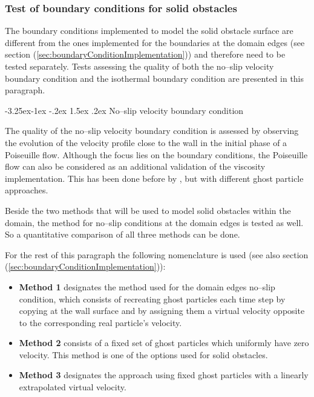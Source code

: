 \documentclass[11pt,a4paper,twoside]{report}
\makeatletter
\renewcommand\paragraph{\@startsection{paragraph}{4}{\z@}%
  {-3.25ex\@plus -1ex \@minus -.2ex}%
  {1.5ex \@plus .2ex}%
  {\normalfont\normalsize\bfseries}}
\makeatother
\begin{document}
\subsubsection{Test of boundary conditions for solid obstacles}
\label{sec:TestSolobs_BC}
The boundary conditions implemented to model the solid obstacle surface are different from the ones implemented for the boundaries at the domain edges (see section (\ref{sec:boundaryConditionImplementation})) and therefore need to be tested separately.
Tests assessing the quality of both the no--slip velocity boundary condition and the isothermal boundary condition are presented in this paragraph. 

\paragraph{No--slip velocity boundary condition}
\label{sec:TestSolobs_BC_noSlip}

The quality of the no--slip velocity boundary condition is assessed by observing the evolution of the velocity profile close to the wall in the initial phase of a Poiseuille flow. Although the focus lies on the boundary conditions, the Poiseuille flow can also be considered as an additional validation of the viscosity implementation. This has been done before by \cite{Basa2009}, but with different ghost particle approaches.

Beside the two methods that will be used to model solid obstacles within the domain, the method for no--slip conditions at the domain edges is tested as well. So a quantitative comparison of all three methods can be done.

For the rest of this paragraph the following nomenclature is used (see also section (\ref{sec:boundaryConditionImplementation})):
\begin{itemize}
 \item {\bf Method 1} designates the method used for the domain edges no--slip condition, which consists of recreating ghost particles each time step by copying at the wall surface and  by assigning them a virtual velocity opposite to the corresponding real particle's velocity.
\item {\bf Method 2} consists of a fixed set of ghost particles which uniformly have zero velocity. This method is one of the options used for solid obstacles.
\item {\bf Method 3} designates the approach using fixed ghost particles with a linearly extrapolated virtual velocity.
\end{itemize}
\end{document}
